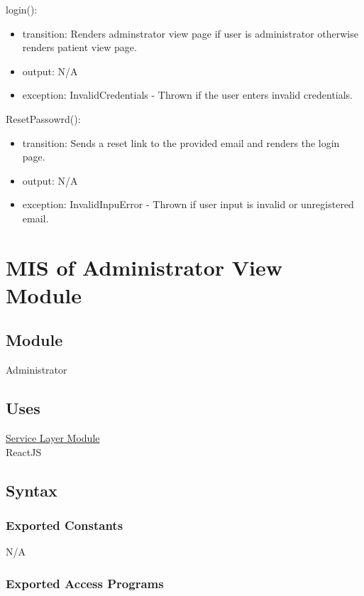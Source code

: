 \documentclass[12pt, titlepage]{article}
\begin{document}
\noindent login():
\begin{itemize}
\item transition: Renders adminstrator view page if user is administrator otherwise renders patient view page. 
\item output: N/A
\item exception: InvalidCredentials - Thrown if the user enters invalid credentials.
\end{itemize}

\noindent ResetPassowrd():
\begin{itemize}
\item transition: Sends a reset link to the provided email and renders the login page.
\item output: N/A
\item exception: InvalidInpuError - Thrown if user input is invalid or unregistered email.
\end{itemize}

\newpage


\section{MIS of Administrator View Module} \label{Module_AdminView}

\subsection{Module}
Administrator

\subsection{Uses}
\hyperref[Module_Service Layer]{Service Layer Module} \\
ReactJS\\

\subsection{Syntax}

\subsubsection{Exported Constants}
N/A

\subsubsection{Exported Access Programs}
\end{document}
